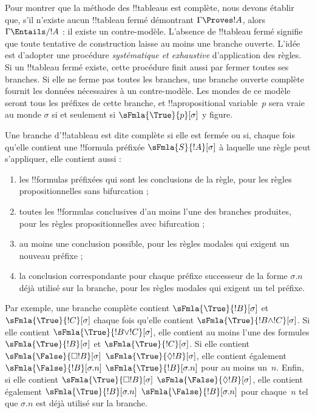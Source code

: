 \documentclass[../../../include/open-logic-section]{subfiles}
\begin{document}


\begin{explain}
  Pour montrer que la méthode des !!{tableau}s est complète, nous
  devons établir que, s'il n'existe aucun !!{tableau} fermé démontrant
  $\Gamma \Proves !A$, alors $\Gamma \Entails/ !A$ : il existe un
  contre-modèle. L'absence de !!{tableau} fermé signifie que toute
  tentative de construction laisse au moins une branche ouverte.
  L'idée est d'adopter une procédure \emph{systématique et exhaustive}
  d'application des règles. Si un !!{tableau} fermé existe, cette
  procédure finit aussi par fermer toutes ses branches. Si elle ne
  ferme pas toutes les branches,
  une branche ouverte complète fournit les données nécessaires à un
  contre-modèle. Les mondes de ce modèle seront tous les préfixes de
  cette branche, et !!a{propositional variable}~$p$ sera vraie au monde
  $\sigma$ si et seulement si $\sFmla{\True}{p}[\sigma]$ y figure.
\end{explain}

\begin{defn}
  Une branche d'!!a{tableau} est dite complète si elle est fermée ou
  si, chaque fois qu'elle contient une !!{formula} préfixée
  $\sFmla{S}{!A}[\sigma]$ à laquelle une règle peut s'appliquer, elle
  contient aussi :
  \begin{enumerate}
    \item les !!{formula}s préfixées qui sont les conclusions de la
      règle, pour les règles propositionnelles sans bifurcation ;
    \item toutes les !!{formula}s conclusives d’au moins l’une des branches produites, pour
      les règles propositionnelles avec bifurcation ;
    \item au moins une conclusion possible, pour les règles modales
      qui exigent un nouveau préfixe ;
    \item la conclusion correspondante pour chaque préfixe successeur
      de la forme $\sigma.n$ déjà utilisé sur la branche, pour les
      règles modales qui exigent un tel préfixe.
  \end{enumerate}
\end{defn}

\begin{explain}
Par exemple, une branche complète contient $\sFmla{\True}{!B}[\sigma]$
et $\sFmla{\True}{!C}[\sigma]$ chaque fois qu'elle contient
$\sFmla{\True}{!B \land !C}[\sigma]$. Si elle contient
$\sFmla{\True}{!B \lor !C}[\sigma]$, elle contient au moins l'une
des formules $\sFmla{\True}{!B}[\sigma]$ et
$\sFmla{\True}{!C}[\sigma]$. Si elle contient 
{$\sFmla{\False}{\Box !B}[\sigma]$} {$\sFmla{\True}{\Diamond !B}[\sigma]$},
elle contient également 
{$\sFmla{\False}{!B}[\sigma.n]$}
{$\sFmla{\True}{!B}[\sigma.n]$} pour au moins un~$n$. Enfin,
si elle contient  {$\sFmla{\True}{\Box !B}[\sigma]$}
{$\sFmla{\False}{\Diamond !B}[\sigma]$}, elle contient également 
{$\sFmla{\True}{!B}[\sigma.n]$}
{$\sFmla{\False}{!B}[\sigma.n]$} pour chaque~$n$ tel que
$\sigma.n$ est déjà utilisé sur la branche.
\end{explain}
\end{document}
